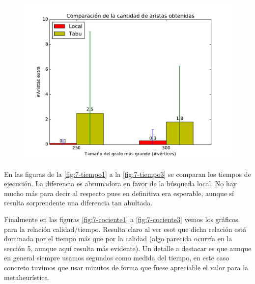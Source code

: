 \begin{figure}[H]
\begin{minipage}{0.49\textwidth}
  \centering
    \includegraphics[width=1\textwidth]{graficos/problema_7/calidad4.pdf}
  \caption{}
  \label{fig:7-calidad3}
\end{minipage}%
\end{figure}

En las figuras de la \ref{fig:7-tiempo1} a la \ref{fig:7-tiempo3} se comparan los tiempos de ejecución. La diferencia es abrumadora en favor de la búsqueda local. No hay mucho más para decir al respecto pues en definitiva era esperable, aunque sí resulta sorprendente una diferencia tan abultada. 

Finalmente en las figuras \ref{fig:7-cociente1} a \ref{fig:7-cociente3} vemos los gráficos para la relación calidad/tiempo. Resulta claro al ver esot que dicha relación está dominada por el tiempo más que por la calidad (algo parecida ocurría en la sección 5, aunque aquí resulta más evidente). Un detalle a destacar es que aunque en general siempre usamos segundos como medida del tiempo, en este caso concreto tuvimos que usar minutos de forma que fuese apreciable el valor para la metaheurística.

